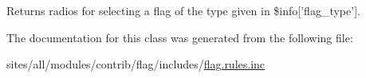 Returns radios for selecting a flag of the type given in \$info\mbox{[}'flag\_\-type'\mbox{]}. 

The documentation for this class was generated from the following file:\begin{CompactItemize}
\item 
sites/all/modules/contrib/flag/includes/\hyperlink{flag_8rules_8inc}{flag.rules.inc}\end{CompactItemize}
